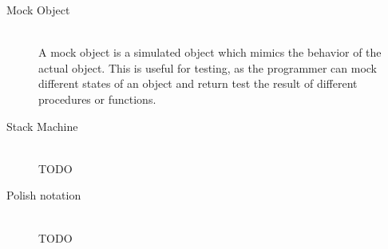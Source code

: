 \begin{description}
\item[Mock Object] \hfill \\
  A mock object is a simulated object which mimics the behavior of the
  actual object. This is useful for testing, as the programmer can
  mock different states of an object and return test the result of
  different procedures or functions. %

\item[Stack Machine] \hfill \\
  TODO

\item[Polish notation] \hfill \\
  TODO

\end{description}


% 
